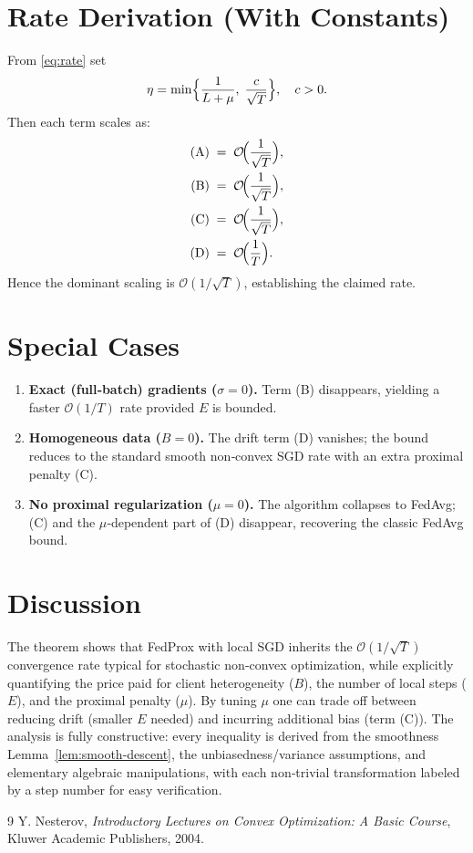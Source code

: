 \documentclass{article}
\begin{document}
\section*{Rate Derivation (With Constants)}
From \eqref{eq:rate} set
\[
\eta = \min\Bigl\{\frac{1}{L+\mu},\;\frac{c}{\sqrt{T}}\Bigr\},
\quad c>0.
\]
Then each term scales as:
\begin{align*}
\text{(A)} &\;=\; \mathcal{O}\!\Bigl(\frac{1}{\sqrt{T}}\Bigr),\\
\text{(B)} &\;=\; \mathcal{O}\!\Bigl(\frac{1}{\sqrt{T}}\Bigr),\\
\text{(C)} &\;=\; \mathcal{O}\!\Bigl(\frac{1}{\sqrt{T}}\Bigr),\\
\text{(D)} &\;=\; \mathcal{O}\!\Bigl(\frac{1}{T}\Bigr).
\end{align*}
Hence the dominant scaling is $\mathcal{O}(1/\sqrt{T})$, establishing the claimed rate.

\section*{Special Cases}
\begin{enumerate}
    \item \textbf{Exact (full‑batch) gradients ($\sigma=0$).}  Term (B) disappears, yielding a faster $\mathcal{O}(1/T)$ rate provided $E$ is bounded.
    \item \textbf{Homogeneous data ($B=0$).}  The drift term (D) vanishes; the bound reduces to the standard smooth non‑convex SGD rate with an extra proximal penalty (C).
    \item \textbf{No proximal regularization ($\mu=0$).}  The algorithm collapses to FedAvg; (C) and the $\mu$‑dependent part of (D) disappear, recovering the classic FedAvg bound.
\end{enumerate}

\section*{Discussion}
The theorem shows that FedProx with local SGD inherits the $\mathcal{O}(1/\sqrt{T})$ convergence rate typical for stochastic non‑convex optimization, while explicitly quantifying the price paid for client heterogeneity ($B$), the number of local steps ($E$), and the proximal penalty ($\mu$).  By tuning $\mu$ one can trade off between reducing drift (smaller $E$ needed) and incurring additional bias (term (C)).  The analysis is fully constructive: every inequality is derived from the smoothness Lemma~\ref{lem:smooth-descent}, the unbiasedness/variance assumptions, and elementary algebraic manipulations, with each non‑trivial transformation labeled by a step number for easy verification.

\begin{thebibliography}{9}
Y. Nesterov, \emph{Introductory Lectures on Convex Optimization: A Basic Course}, Kluwer Academic Publishers, 2004.
\end{thebibliography}
\end{document}
